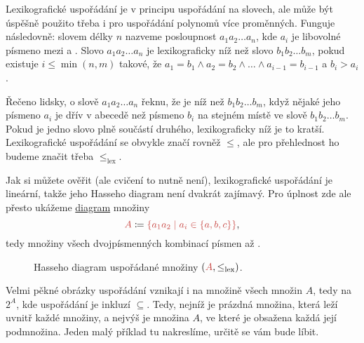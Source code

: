 Lexikografické uspořádání je v principu uspořádání na slovech, ale může být
úspěšně použito třeba i pro uspořádání polynomů více proměnných. Funguje
následovně: slovem délky $n$ nazveme posloupnost $a_1a_2\ldots a_n$, kde $a_i$
je libovolné písmeno mezi  a . Slovo $a_1a_2\ldots a_n$ je
lexikograficky níž než slovo $b_1b_2\ldots b_m$, pokud existuje $i \leq
\min(n,m)$ takové, že $a_1 = b_1 \wedge a_2 = b_2 \wedge \ldots \wedge a_{i-1} =
b_{i-1}$ a $b_i > a_i$.

Řečeno lidsky, o slově $a_1a_2\ldots a_n$ řeknu, že je níž než $b_1b_2\ldots
b_m$, když nějaké jeho písmeno $a_i$ je dřív v abecedě než písmeno $b_i$ na
stejném místě ve slově $b_1b_2\ldots b_m$. Pokud je jedno slovo plně součástí
druhého, lexikograficky níž je to kratší. Lexikografické uspořádání se obvykle
značí rovněž $ \leq $, ale pro přehlednost ho budeme značit třeba
$\leq_{\text{lex}}$.

\begin{example}
 Jak si můžete ověřit (ale cvičení to nutně není), lexikografické uspořádání je
 lineární, takže jeho Hasseho diagram není dvakrát zajímavý. Pro úplnost zde
 ale přesto ukážeme \hyperref[fig:hasse-lex]{diagram} množiny
 \[
  \clr{A} \coloneqq \clr{\{a_1a_2 \mid a_i \in \{a,b,c\}\}},
 \]
 tedy množiny všech dvojpísmenných kombinací písmen  až .
 \begin{figure}[H]
  \centering
  \caption{Hasseho diagram uspořádané množiny $(\clr{A}, \leq_{\text{lex}})$.}
  \label{fig:hasse-lex}
 \end{figure}
\end{example}

Velmi pěkné obrázky uspořádání vznikají i na množině všech množin $A$, tedy na
$2^{A}$, kde uspořádání je inkluzí $ \subseteq $. Tedy, nejníž je prázdná
množina, která leží uvnitř každé množiny, a nejvýš je množina $A$, ve které je
obsažena každá její podmnožina. Jeden malý příklad tu nakreslíme, určitě se vám
bude líbit.

